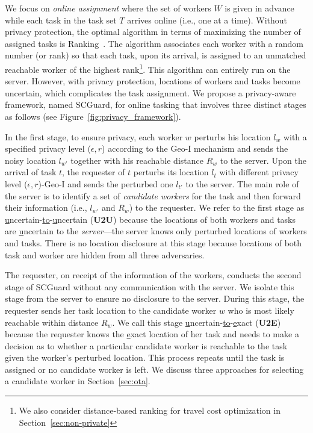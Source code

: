 \documentclass{USC-Thesis}
\numberwithin{equation}{chapter}
\begin{document}
We focus on \emph{online assignment} where the set of workers $W$ is given in advance while each task in the task set $T$ arrives online (i.e., one at a time). Without privacy protection, the optimal algorithm in terms of maximizing the number of assigned tasks is Ranking~\cite{karp1990optimal}. The algorithm associates each worker with a random number (or rank) so that each task, upon its arrival, is assigned to an unmatched reachable worker of the highest rank\footnote{We also consider distance-based ranking for travel cost optimization in Section~\ref{sec:non-private}}. This algorithm can entirely run on the server. However, with privacy protection, locations of workers and tasks become uncertain, which complicates the task assignment. We propose a privacy-aware framework, named SCGuard, for online tasking that involves three distinct stages as follows (see Figure~\ref{fig:privacy_framework}).

In the first stage, to ensure privacy, each worker $w$ perturbs his location $l_w$ with a specified privacy level ($\epsilon,r$) according to the Geo-I mechanism and sends the noisy location $l_{w'}$ together with his reachable distance $R_w$ to the server. Upon the arrival of task $t$, the requester of $t$ perturbs its location $l_t$ with different privacy level ($\epsilon,r$)-Geo-I and sends the perturbed one $l_{t'}$ to the server. The main role of the server is to identify a set of \emph{candidate workers} for the task and then forward their information (i.e., $l_{w'}$ and $R_w$) to the requester. We refer to the first stage as \underline{u}ncertain-\underline{to}-\underline{u}ncertain (\textbf{U2U}) because the locations of both workers and tasks are \underline{u}ncertain to the \emph{server}---the server knows only perturbed locations of workers and tasks. There is no location disclosure at this stage because locations of both task and worker are hidden from all three adversaries. 

The requester, on receipt of the information of the workers, conducts the second stage of SCGuard without any communication with the server. We isolate this stage from the server to ensure no disclosure to the server. During this stage, the requester sends her task location to the candidate worker $w$ who is most likely reachable within distance $R_w$. We call this stage \underline{u}ncertain-\underline{to}-\underline{e}xact (\textbf{U2E}) because the requester knows the \underline{e}xact location of her task and needs to make a decision as to whether a particular candidate worker is reachable to the task given the worker's perturbed location. This process repeats until the task is assigned or no candidate worker is left.
We discuss three approaches for selecting a candidate worker in Section~\ref{sec:ota}.
\end{document}
